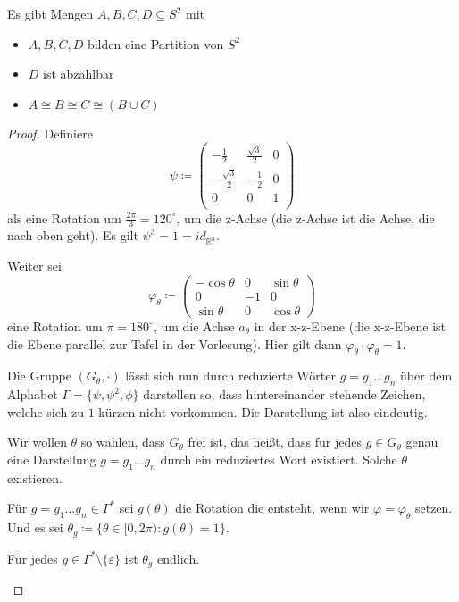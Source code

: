\begin{satz}
	Es gibt Mengen $A,B,C,D\subseteq S^2$ mit
	\begin{itemize}
		\item $A,B,C,D$ bilden eine Partition von $S^2$
		\item $D$ ist abzählbar
		\item $A\cong B \cong C \cong (B\cup C)$
	\end{itemize}
\end{satz}
\begin{proof}
	Definiere
	$$
	\psi\coloneqq
	\begin{pmatrix}
		-\frac{1}{2} & \frac{\sqrt{3}}{2} & 0 \\
		-\frac{\sqrt{3}}{2} & -\frac{1}{2} & 0 \\
		0 & 0 & 1 \\
	\end{pmatrix}
	$$
	als eine Rotation um $\frac{2\pi}{3}=120^\circ$, um die z-Achse (die z-Achse ist die Achse, die nach \glqq oben\grqq{} geht). Es gilt $\psi^3=1=id_{\mathbb{R}^3}$.
		
	Weiter sei 
	$$
	\varphi_\theta\coloneqq
	\begin{pmatrix}
		-\cos \theta & 0 & \sin \theta \\
		0 & -1 & 0 \\
		\sin \theta & 0 & \cos \theta 
	\end{pmatrix}
	$$
	eine Rotation um $\pi=180^\circ$, um die Achse $a_\theta$ in der x-z-Ebene (die x-z-Ebene ist die Ebene parallel zur Tafel in der Vorlesung). Hier gilt dann $\varphi_\theta\cdot\varphi_\theta=1$.
	
	Die Gruppe $(G_\theta, \cdot)$ lässt sich nun durch reduzierte Wörter $g=g_1\dots g_n$ über dem Alphabet $\Gamma=\{\psi, \psi^2,\phi\}$ darstellen so, dass hintereinander stehende Zeichen, welche sich zu $1$ kürzen nicht vorkommen. Die Darstellung ist also eindeutig.
	
	Wir wollen $\theta$ so wählen, dass $G_\theta$ frei ist, das heißt, dass für jedes $g\in G_\theta$ genau eine Darstellung $g=g_1\dots g_n$ durch ein reduziertes Wort existiert. Solche $\theta$ existieren.
	
	Für $g=g_1\dots g_n\in \Gamma^\ast$ sei $g(\theta)$ die Rotation die entsteht, wenn wir $\varphi=\varphi_\theta$ setzen. Und es sei $\theta_g\coloneqq\{\theta\in[0,2\pi) : g(\theta)=1\}$.
	
	\begin{lemma}
		Für jedes $g\in\Gamma^\ast\setminus\{\varepsilon\}$ ist $\theta_g$ endlich.
		\label{HausdorffOhneProof}
	\end{lemma}


\end{proof}
